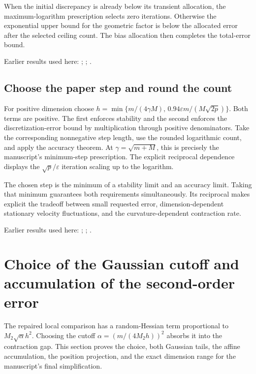 \documentclass[11pt,a4paper]{report}
\begin{document}
When the initial discrepancy is already below its transient allocation, the maximum-logarithm prescription selects zero iterations. Otherwise the exponential upper bound for the geometric factor is below the allocated error after the selected ceiling count. The bias allocation then completes the total-error bound.



Earlier results used here: \cite[Section~3.17.3]{LangevinLean2026ULASC}; \cite[Section~3.17.4]{LangevinLean2026ULASC}; \cite[Section~3.26.3]{LangevinLean2026ULASC}.
\subsection{\texorpdfstring{Choose the paper step and round the count}{Choose the paper step and round the count}}
\label{report-step-KineticLangevin-Accuracy-lean-3}


For positive dimension choose \(h=\min\{m/(4\gamma M),\,0.94\varepsilon m/(M\sqrt{2p})\}\). Both terms are positive. The first enforces stability and the second enforces the discretization-error bound by multiplication through positive denominators. Take the corresponding nonnegative step length, use the rounded logarithmic count, and apply the accuracy theorem. At \(\gamma=\sqrt{m+M}\), this is precisely the manuscript’s minimum-step prescription. The explicit reciprocal dependence displays the \(\sqrt p/\varepsilon\) iteration scaling up to the logarithm.



The chosen step is the minimum of a stability limit and an accuracy limit. Taking that minimum guarantees both requirements simultaneously. Its reciprocal makes explicit the tradeoff between small requested error, dimension-dependent stationary velocity fluctuations, and the curvature-dependent contraction rate.



Earlier results used here: \cite[Section~3.17.3]{LangevinLean2026ULASC}; \cite[Section~3.17.4]{LangevinLean2026ULASC}; \cite[Section~3.26.3]{LangevinLean2026ULASC}.
\section{\texorpdfstring{Choice of the Gaussian cutoff and accumulation of the second-order error}{Choice of the Gaussian cutoff and accumulation of the second-order error}}
\label{proof-module-KineticLangevin-SecondOrderRecurrence-lean}


The repaired local comparison has a random-Hessian term proportional to \(M_2\sqrt\alpha h^2\). Choosing the cutoff \(\alpha=(m/(4M_2h))^2\) absorbs it into the contraction gap. This section proves the choice, both Gaussian tails, the affine accumulation, the position projection, and the exact dimension range for the manuscript’s final simplification.
\end{document}
